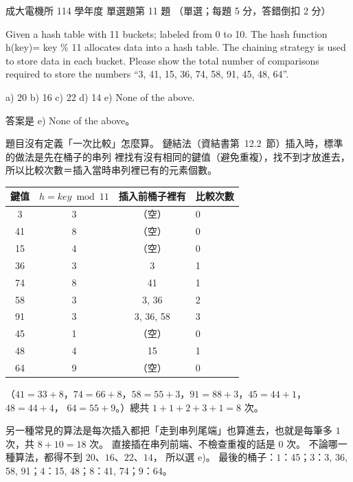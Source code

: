 \begin{pastexam}[label={px:ncku-114-ee-ds-11}]{成大電機所 114 學年度 單選題第 11 題}
（單選；每題 5 分，答錯倒扣 2 分）

Given a hash table with 11 buckets; labeled from 0 to 10. The hash function h(key)= key \% 11
allocates data into a hash table. The chaining strategy is used to store data in each bucket.
Please show the total number of comparisons required to store the numbers ``3, 41, 15, 36, 74,
58, 91, 45, 48, 64''.

a) 20 \quad b) 16 \quad c) 22 \quad d) 14 \quad e) None of the above.
\end{pastexam}

\begin{pastsoln}
答案是 e) None of the above。

題目沒有定義「一次比較」怎麼算。 鏈結法（資結書第~12.2~節）插入時，標準的做法是先在桶子的串列
裡找有沒有相同的鍵值（避免重複），找不到才放進去，所以比較次數＝插入當時串列裡已有的元素個數。
\begin{center}
\begin{tabular}{cccl}
\toprule
鍵值 & $h = \mathit{key} \bmod 11$ & 插入前桶子裡有 & 比較次數 \\
\midrule
3 & 3 & （空） & 0 \\
41 & 8 & （空） & 0 \\
15 & 4 & （空） & 0 \\
36 & 3 & 3 & 1 \\
74 & 8 & 41 & 1 \\
58 & 3 & 3, 36 & 2 \\
91 & 3 & 3, 36, 58 & 3 \\
45 & 1 & （空） & 0 \\
48 & 4 & 15 & 1 \\
64 & 9 & （空） & 0 \\
\bottomrule
\end{tabular}
\end{center}
（$41 = 33 + 8$，$74 = 66 + 8$，$58 = 55 + 3$，$91 = 88 + 3$，$45 = 44 + 1$，$48 = 44 + 4$，
$64 = 55 + 9$。）總共 $1 + 1 + 2 + 3 + 1 = 8$ 次。

另一種常見的算法是每次插入都把「走到串列尾端」也算進去，也就是每筆多 $1$ 次，共 $8 + 10 = 18$ 次。
直接插在串列前端、不檢查重複的話是 $0$ 次。 不論哪一種算法，都得不到 $20$、$16$、$22$、$14$，
所以選 e)。 最後的桶子：$1$：45；$3$：3, 36, 58, 91；$4$：15, 48；$8$：41, 74；$9$：64。
\end{pastsoln}
